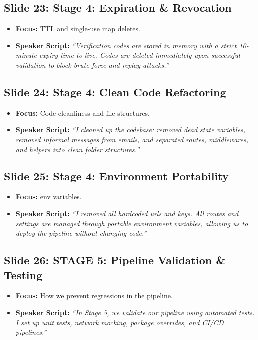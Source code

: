 \documentclass[11pt]{article}
\begin{document}
\subsection{Slide 23: Stage 4: Expiration \& Revocation}
\begin{itemize}
    \item \textbf{Focus:} TTL and single-use map deletes.
    \item \textbf{Speaker Script:} 
    \textit{``Verification codes are stored in memory with a strict 10-minute expiry time-to-live. Codes are deleted immediately upon successful validation to block brute-force and replay attacks.''}
\end{itemize}

\subsection{Slide 24: Stage 4: Clean Code Refactoring}
\begin{itemize}
    \item \textbf{Focus:} Code cleanliness and file structures.
    \item \textbf{Speaker Script:} 
    \textit{``I cleaned up the codebase: removed dead state variables, removed informal messages from emails, and separated routes, middlewares, and helpers into clean folder structures.''}
\end{itemize}

\subsection{Slide 25: Stage 4: Environment Portability}
\begin{itemize}
    \item \textbf{Focus:} env variables.
    \item \textbf{Speaker Script:} 
    \textit{``I removed all hardcoded urls and keys. All routes and settings are managed through portable environment variables, allowing us to deploy the pipeline without changing code.''}
\end{itemize}

\subsection{Slide 26: STAGE 5: Pipeline Validation \& Testing}
\begin{itemize}
    \item \textbf{Focus:} How we prevent regressions in the pipeline.
    \item \textbf{Speaker Script:} 
    \textit{``In Stage 5, we validate our pipeline using automated tests. I set up unit tests, network mocking, package overrides, and CI/CD pipelines.''}
\end{itemize}
\end{document}
